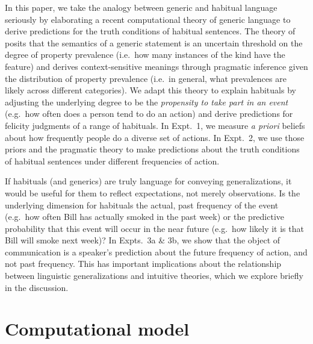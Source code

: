 \documentclass[10pt,letterpaper]{article}
\newcommand{\ndg}[1]{\textcolor{Green}{[ndg: #1]}}
\newcommand{\mht}[1]{\textcolor{DarkOrange}{[mht: #1]}}
\begin{document}
In this paper, we take the analogy between generic and habitual language seriously by elaborating a recent computational theory of generic language to derive predictions for the truth conditions of habitual sentences. 
The theory of  posits that the semantics of a generic statement is an uncertain threshold on the degree of property prevalence (i.e.~how many instances of the kind have the feature) and derives context-sensitive meanings through pragmatic inference given the distribution of property prevalence (i.e.~in general, what prevalences are  likely across different categories).
We adapt this theory to explain habituals by adjusting the underlying degree to be the \emph{propensity to take part in an event} (e.g.~how often does a person tend to do an action) and derive predictions for felicity judgments of a range of habituals.
In Expt.~1, we measure \emph{a priori} beliefs about how frequently people do a diverse set of actions.
In Expt.~2, we use those priors and the pragmatic theory to make predictions about the truth conditions of habitual sentences under different frequencies of action. 


If habituals (and generics) are truly language for conveying generalizations, it would be useful for them to reflect expectations, not merely observations.
Is the underlying dimension for habituals the actual, past frequency of the event (e.g.~how often Bill has actually smoked in the past week) or the predictive probability that this event will occur in the near future (e.g.~how likely it is that Bill will smoke next week)?
In Expts.~3a \& 3b, we show that the object of communication is a speaker's prediction about the future frequency of action, and not past frequency.
This has important implications about the relationship between linguistic generalizations and intuitive theories, which we explore briefly in the discussion.


\section{Computational model}
\end{document}
